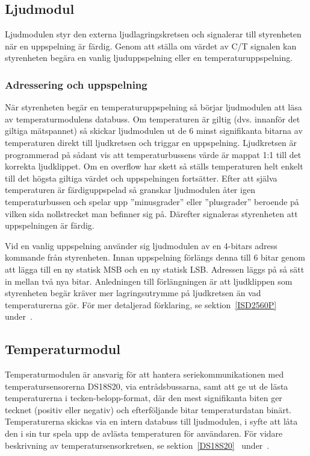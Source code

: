 \documentclass[a4paper,11pt]{article}
\begin{document}
	\subsection{Ljudmodul}
		Ljudmodulen styr den externa ljudlagringskretsen och signalerar till styrenheten när en uppspelning är färdig. Genom att ställa om värdet av C/T signalen kan styrenheten begära en vanlig ljuduppspelning eller en temperaturuppspelning.

		\subsubsection{Adressering och uppspelning}
När styrenheten begär en temperaturuppspelning så börjar ljudmodulen att läsa av temperaturmodulens databuss. Om temperaturen är giltig (dvs. innanför det giltiga mätspannet) så skickar ljudmodulen ut de 6 minst signifikanta bitarna av temperaturen direkt till ljudkretsen och triggar en uppspelning. Ljudkretsen är programmerad på sådant vis att temperaturbussens värde är mappat 1:1 till det korrekta ljudklippet.  Om en overflow har skett så ställs temperaturen helt enkelt till det högsta giltiga värdet och uppspelningen fortsätter. Efter att själva temperaturen är färdiguppspelad så granskar ljudmodulen åter igen temperaturbussen och spelar upp ''minusgrader'' eller ''plusgrader'' beroende på vilken sida nollstrecket man befinner sig på. Därefter signaleras styrenheten att uppspelningen är färdig.

Vid en vanlig uppspelning använder sig ljudmodulen av en 4-bitars adress kommande från styrenheten. Innan uppspelning förlängs denna till 6 bitar genom att lägga till en ny statisk MSB och en ny statisk LSB. Adressen läggs på så sätt in mellan två nya bitar. Anledningen till förlängningen är att ljudklippen som styrenheten begär kräver mer lagringsutrymme på ljudkretsen än vad temperaturerna gör. För mer detaljerad förklaring, se sektion~\ref{ISD2560P}~ under~.

	\subsection{Temperaturmodul}

	Temperaturmodulen är ansvarig för att hantera seriekommunikationen med 
	temperatursensorerna DS18S20, via entrådsbussarna, samt att ge ut de lästa temperaturerna
	i tecken-belopp-format, där den mest signifikanta biten ger tecknet (positiv eller negativ) och efterföljande bitar temperaturdatan binärt.
	Temperaturerna skickas via en intern databuss till ljudmodulen, i syfte att låta den i sin tur spela upp de avlästa temperaturen för användaren. 
	För vidare beskrivning av temperatursensorkretsen, se sektion~\ref{DS18S20}~ under~.
\end{document}
